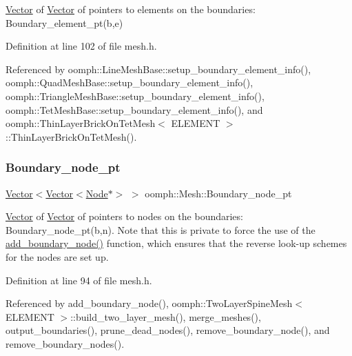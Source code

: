 \hyperlink{classoomph_1_1Vector}{Vector} of \hyperlink{classoomph_1_1Vector}{Vector} of pointers to elements on the boundaries\+: Boundary\+\_\+element\+\_\+pt(b,e) 



Definition at line 102 of file mesh.\+h.



Referenced by oomph\+::\+Line\+Mesh\+Base\+::setup\+\_\+boundary\+\_\+element\+\_\+info(), oomph\+::\+Quad\+Mesh\+Base\+::setup\+\_\+boundary\+\_\+element\+\_\+info(), oomph\+::\+Triangle\+Mesh\+Base\+::setup\+\_\+boundary\+\_\+element\+\_\+info(), oomph\+::\+Tet\+Mesh\+Base\+::setup\+\_\+boundary\+\_\+element\+\_\+info(), and oomph\+::\+Thin\+Layer\+Brick\+On\+Tet\+Mesh$<$ E\+L\+E\+M\+E\+N\+T $>$\+::\+Thin\+Layer\+Brick\+On\+Tet\+Mesh().

\mbox{\label{classoomph_1_1Mesh_abbba08d3de5cccd78ee98afc7b2f61fc}} 
\subsubsection{\texorpdfstring{Boundary\+\_\+node\+\_\+pt}{Boundary\_node\_pt}}
{\footnotesize\ttfamily \hyperlink{classoomph_1_1Vector}{Vector}$<$\hyperlink{classoomph_1_1Vector}{Vector}$<$\hyperlink{classoomph_1_1Node}{Node}$\ast$$>$ $>$ oomph\+::\+Mesh\+::\+Boundary\+\_\+node\+\_\+pt\hspace{0.3cm}{\ttfamily [protected]}}



\hyperlink{classoomph_1_1Vector}{Vector} of \hyperlink{classoomph_1_1Vector}{Vector} of pointers to nodes on the boundaries\+: Boundary\+\_\+node\+\_\+pt(b,n). Note that this is private to force the use of the \hyperlink{classoomph_1_1Mesh_a007b102ac8e42328872ad658d7110bfc}{add\+\_\+boundary\+\_\+node()} function, which ensures that the reverse look-\/up schemes for the nodes are set up. 



Definition at line 94 of file mesh.\+h.



Referenced by add\+\_\+boundary\+\_\+node(), oomph\+::\+Two\+Layer\+Spine\+Mesh$<$ E\+L\+E\+M\+E\+N\+T $>$\+::build\+\_\+two\+\_\+layer\+\_\+mesh(), merge\+\_\+meshes(), output\+\_\+boundaries(), prune\+\_\+dead\+\_\+nodes(), remove\+\_\+boundary\+\_\+node(), and remove\+\_\+boundary\+\_\+nodes().

